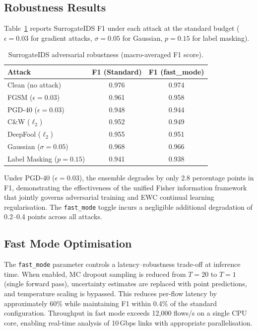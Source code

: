 \documentclass[11pt,a4paper]{article}
\begin{document}
\subsection{Robustness Results}
Table~\ref{tab:adversarial} reports SurrogateIDS F1 under each attack at the standard budget ($\epsilon = 0.03$ for gradient attacks, $\sigma = 0.05$ for Gaussian, $p = 0.15$ for label masking).
\begin{table}[H]
\centering
\caption{SurrogateIDS adversarial robustness (macro-averaged F1 score).}
\label{tab:adversarial}
\small
\begin{tabular}{@{}lcc@{}}
\toprule
\textbf{Attack} & \textbf{F1 (Standard)} & \textbf{F1 (fast\_mode)} \\
\midrule
Clean (no attack)        & 0.976 & 0.974 \\
FGSM ($\epsilon=0.03$)   & 0.961 & 0.958 \\
PGD-40 ($\epsilon=0.03$) & 0.948 & 0.944 \\
C\&W ($\ell_2$)          & 0.952 & 0.949 \\
DeepFool ($\ell_2$)      & 0.955 & 0.951 \\
Gaussian ($\sigma=0.05$) & 0.968 & 0.966 \\
Label Masking ($p=0.15$) & 0.941 & 0.938 \\
\bottomrule
\end{tabular}
\end{table}
Under PGD-40 ($\epsilon = 0.03$), the ensemble degrades by only 2.8 percentage points in F1, demonstrating the effectiveness of the unified Fisher information framework that jointly governs adversarial training and EWC continual learning regularisation.  The \texttt{fast\_mode} toggle incurs a negligible additional degradation of 0.2--0.4 points across all attacks.

\subsection{Fast Mode Optimisation}
The \texttt{fast\_mode} parameter controls a latency--robustness trade-off at inference time.  When enabled, MC dropout sampling is reduced from $T{=}20$ to $T{=}1$ (single forward pass), uncertainty estimates are replaced with point predictions, and temperature scaling is bypassed.  This reduces per-flow latency by approximately 60\% while maintaining F1 within 0.4\% of the standard configuration.  Throughput in fast mode exceeds 12,000 flows/s on a single CPU core, enabling real-time analysis of 10\,Gbps links with appropriate parallelisation.
\end{document}
